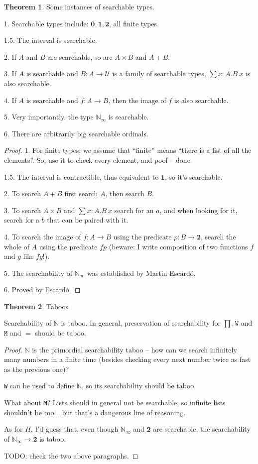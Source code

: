 \documentclass[11pt]{article}
\theoremstyle{definition}
\newtheorem{theorem}{Theorem}[section]
\newcommand{\txt}[1]{\texttt{#1}}
\renewcommand{\(}{\left(}
\renewcommand{\)}{\right)}
\newcommand{\U}{\mathcal{U}}
\newcommand{\apl}[2]{#1\ #2}
\newcommand{\Empty}{\mathbf{0}}
\newcommand{\Unit}{\mathbf{1}}
\newcommand{\Bool}{\mathbf{2}}
\newcommand{\Nat}{\mathbb{N}}
\newcommand{\Conat}{\mathbb{N}_\infty}
\newcommand{\dsum}[2]{\sum #1.#2}
\newcommand{\prodt}[2]{#1 \times #2}
\begin{document}
\begin{theorem} Some instances of searchable types.

1. Searchable types include: $\Empty, \Unit, \Bool$, all finite types.

1.5. The interval is searchable.

2. If $A$ and $B$ are searchable, so are $\prodt{A}{B}$ and $A + B$.

3. If $A$ is searchable and $B : A \to \U$ is a family of searchable types, $\dsum{x : A}{\apl{B}{x}}$ is also searchable.

4. If $A$ is searchable and $f : A \to B$, then the image of $f$ is also searchable.

5. Very importantly, the type $\Conat$ is searchable.

6. There are arbitrarily big searchable ordinals.

\end{theorem}
\begin{proof}
1. For finite types: we assume that ``finite'' means ``there is a list of all the elements''. So, use it to check every element, and poof -- done.

1.5. The interval is contractible, thus equivalent to $\Unit$, so it's searchable.

2. To search $A + B$ first search $A$, then search $B$.

3. To search $\prodt{A}{B}$ and $\dsum{x : A}{\apl{B}{x}}$ search for an $a$, and when looking for it, search for a $b$ that can be paired with it.

4. To search the image of $f : A \to B$ using the predicate $p : B \to \Bool$, search the whole of $A$ using the predicate $fp$ (beware: I write composition of two functions $f$ and $g$ like $fg$!).

5. The searchability of $\Conat$ was established by Martin Escard\'{o}.

6. Proved by Escard\'{o}.

\end{proof}

\begin{theorem} Taboos

Searchability of $\Nat$ is taboo. In general, preservation of searchability for $\prod, \txt{W}$ and $\txt{M}$ and $=$ should be taboo.
\end{theorem}
\begin{proof}
$\Nat$ is the primordial searchability taboo -- how can we search infinitely many numbers in a finite time (besides checking every next number twice as fast as the previous one)?

\txt{W} can be used to define $\Nat$, so its searchability should be taboo.

What about \txt{M}? Lists should in general not be searchable, so infinite lists shouldn't be too... but that's a dangerous line of reasoning.

As for $\Pi$, I'd guess that, even though $\Conat$ and $\Bool$ are searchable, the searchability of $\Conat \to \Bool$ is taboo.

TODO: check the two above paragraphs.
\end{proof}
\end{document}
